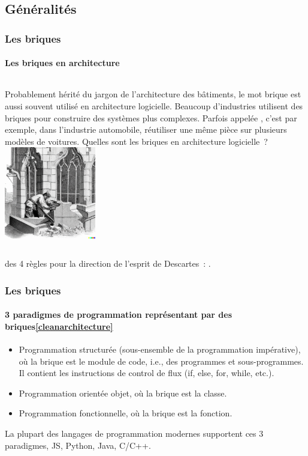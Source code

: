 \documentclass{beamer}
\begin{document}
    \subsection{Généralités}\label{subsec:briques-generalites}
    \begin{frame}
        \transdissolve
        \frametitle{Les briques}
        \framesubtitle{Les briques en architecture}
        \begin{columns}
            Probablement hérité du jargon de l'architecture des bâtiments, le mot brique est aussi souvent utilisé en architecture logicielle.
            \bigbreak
            Beaucoup d'industries utilisent des briques pour construire des systèmes plus complexes.
            Parfois appelée , c'est par exemple, dans l'industrie automobile, réutiliser une même pièce sur plusieurs modèles de voitures.
            \bigbreak
            Quelles sont les briques en architecture logicielle~?
            \centering
            \includegraphics[width=4cm]{image/engraving-of-a-craftman-cutting-a-stone}
        \end{columns}
        \bigbreak
         des 4 règles pour la direction de l'esprit de Descartes~: .
    \end{frame}

    \begin{frame}
        \transdissolve
        \frametitle{Les briques}
        \framesubtitle{3 paradigmes de programmation représentant par des briques\cref{cleanarchitecture}}
        \begin{itemize}
            \item Programmation structurée (sous-ensemble de la programmation impérative), où la brique est le module de code, i.e., des programmes et sous-programmes.
            Il contient les instructions de control de flux (if, else, for, while, etc.).
            \item Programmation orientée objet, où la brique est la classe.
            \item Programmation fonctionnelle, où la brique est la fonction.
        \end{itemize}
        \bigbreak
        La plupart des langages de programmation modernes supportent ces 3 paradigmes, JS, Python, Java, C/C++.
    \end{frame}
\end{document}
